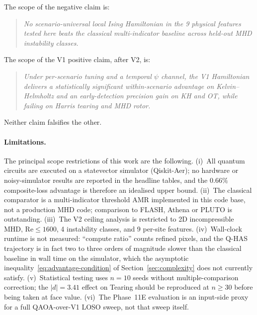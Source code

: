 \documentclass[12pt, a4paper, oneside]{report}
\begin{document}
The scope of the negative claim is:
\begin{quote}
\textit{No scenario-universal local Ising Hamiltonian in the 9 physical features tested here beats the classical multi-indicator baseline across held-out MHD instability classes.}
\end{quote}

The scope of the V1 positive claim, after V2, is:
\begin{quote}
\textit{Under per-scenario tuning and a temporal $\psi$ channel, the V1 Hamiltonian delivers a statistically significant within-scenario advantage on Kelvin--Helmholtz and an early-detection precision gain on KH and OT, while failing on Harris tearing and MHD rotor.}
\end{quote}

Neither claim falsifies the other.

\paragraph{Limitations.}
The principal scope restrictions of this work are the following. (i)~All quantum circuits are executed on a statevector simulator (Qiskit-Aer); no hardware or noisy-simulator results are reported in the headline tables, and the $0.66\%$ composite-loss advantage is therefore an idealised upper bound. (ii)~The classical comparator is a multi-indicator threshold AMR implemented in this code base, not a production MHD code; comparison to FLASH, Athena or PLUTO is outstanding. (iii)~The V2 ceiling analysis is restricted to 2D incompressible MHD, $\mathrm{Re} \le 1600$, 4 instability classes, and 9 per-site features. (iv)~Wall-clock runtime is not measured: ``compute ratio'' counts refined pixels, and the Q-HAS trajectory is in fact two to three orders of magnitude slower than the classical baseline in wall time on the simulator, which the asymptotic inequality~\eqref{eq:advantage-condition} of Section~\ref{sec:complexity} does not currently satisfy. (v)~Statistical testing uses $n = 10$ seeds without multiple-comparison correction; the $|d| = 3.41$ effect on Tearing should be reproduced at $n \ge 30$ before being taken at face value. (vi)~The Phase~11E evaluation is an input-side proxy for a full QAOA-over-V1 LOSO sweep, not that sweep itself.
\end{document}
